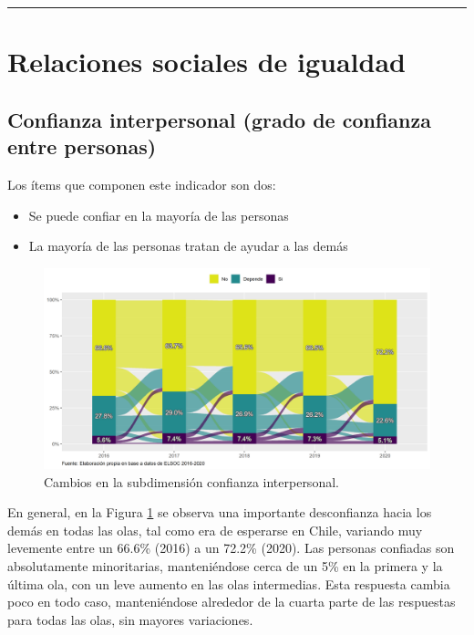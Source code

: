 \documentclass[
  12pt,
]{book}
\begin{document}
\begin{center}\rule{0.5\linewidth}{0.5pt}\end{center}

\hypertarget{relaciones-sociales-de-igualdad-1}{%
\section{Relaciones sociales de igualdad}\label{relaciones-sociales-de-igualdad-1}}

\hypertarget{confianza-interpersonal-grado-de-confianza-entre-personas}{%
\subsection{Confianza interpersonal (grado de confianza entre personas)}\label{confianza-interpersonal-grado-de-confianza-entre-personas}}

Los ítems que componen este indicador son dos:

\begin{itemize}
\item
  Se puede confiar en la mayoría de las personas
\item
  La mayoría de las personas tratan de ayudar a las demás
\end{itemize}

\begin{figure}[H]

{\centering \includegraphics[width=1\linewidth,height=1\textheight]{output/graphs/alluvial_conf_interpersonal} 

}

\caption{Cambios en la subdimensión confianza interpersonal.}\label{fig:alluvial-conf-interpersonal}
\end{figure}

En general, en la Figura \ref{fig:alluvial-conf-interpersonal} se observa una importante desconfianza hacia los demás en todas las olas, tal como era de esperarse en Chile, variando muy levemente entre un 66.6\% (2016) a un 72.2\% (2020). Las personas confiadas son absolutamente minoritarias, manteniéndose cerca de un 5\% en la primera y la última ola, con un leve aumento en las olas intermedias. Esta respuesta cambia poco en todo caso, manteniéndose alrededor de la cuarta parte de las respuestas para todas las olas, sin mayores variaciones.
\end{document}
